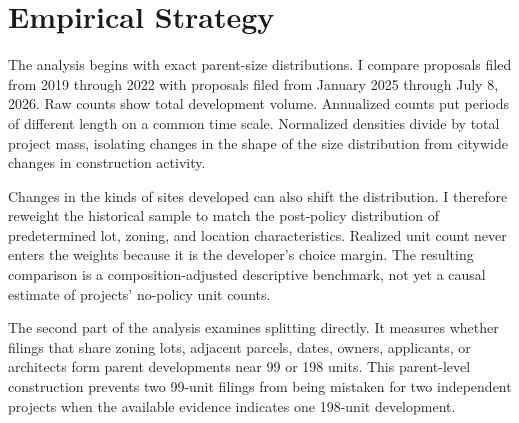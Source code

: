 \section{Empirical Strategy}

The analysis begins with exact parent-size distributions. I compare proposals filed from 2019 through 2022 with proposals filed from January 2025 through July 8, 2026. Raw counts show total development volume. Annualized counts put periods of different length on a common time scale. Normalized densities divide by total project mass, isolating changes in the shape of the size distribution from citywide changes in construction activity.

Changes in the kinds of sites developed can also shift the distribution. I therefore reweight the historical sample to match the post-policy distribution of predetermined lot, zoning, and location characteristics. Realized unit count never enters the weights because it is the developer's choice margin. The resulting comparison is a composition-adjusted descriptive benchmark, not yet a causal estimate of projects' no-policy unit counts.

The second part of the analysis examines splitting directly. It measures whether filings that share zoning lots, adjacent parcels, dates, owners, applicants, or architects form parent developments near 99 or 198 units. This parent-level construction prevents two 99-unit filings from being mistaken for two independent projects when the available evidence indicates one 198-unit development.
